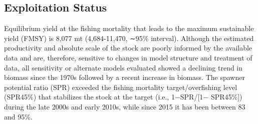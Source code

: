 \documentclass[11pt,
  english,
  a4paper,
]{article}
\begin{document}
\tagmcend\tagstructend


\hypertarget{exploitation-status}{%
\subsection*{Exploitation Status}\label{exploitation-status}}

\leavevmode\tagmcend\tagstructend


Equilibrium yield at the fishing mortality that leads to the maximum sustainable yield (FMSY) is 8,077 mt (4,684-11,470, ∼95\% interval). Although the estimated productivity and absolute scale of the stock are poorly informed by the available data and are, therefore, sensitive to changes in model structure and treatment of data, all sensitivity or alternate models evaluated showed a declining trend in biomass since the 1970s followed by a recent increase in biomass. The spawner potential ratio (SPR) exceeded the fishing mortality target/overfishing level (SPR45\%) that stabilizes the stock at the target (i.e., 1−SPR/{[}1− SPR45\%{]}) during the late 2000s and early 2010s, while since 2015 it has been between 83 and 95\%.

\leavevmode\tagmcend\tagstructend\par

\begingroup\fontsize{10}{12}\selectfont
\begingroup\fontsize{10}{12}\selectfont
\end{document}
